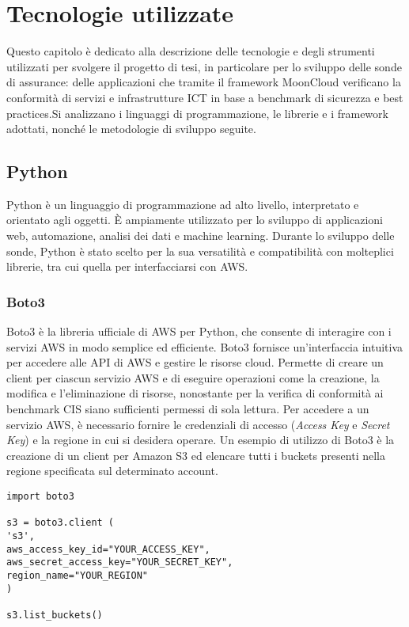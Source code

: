 \chapter{Tecnologie utilizzate}
\label{cap:tecnologie}

Questo capitolo è dedicato alla descrizione delle tecnologie e degli strumenti utilizzati per svolgere il progetto di tesi, in particolare per lo sviluppo delle sonde di assurance: delle applicazioni che tramite il framework MoonCloud verificano la conformità di servizi e infrastrutture ICT in base a benchmark di sicurezza e best practices.Si analizzano i linguaggi di programmazione, le librerie e i framework adottati, nonché le metodologie di sviluppo seguite. 


\section{Python}
\label{sec:python}

Python è un linguaggio di programmazione ad alto livello, interpretato e orientato agli oggetti. È ampiamente utilizzato per lo sviluppo di applicazioni web, automazione, analisi dei dati e machine learning. Durante lo sviluppo delle sonde, Python è stato scelto per la sua versatilità e compatibilità con molteplici librerie, tra cui quella per interfacciarsi con AWS.

\subsection{Boto3}
\label{sec:boto3}

Boto3 è la libreria ufficiale di AWS per Python, che consente di interagire con i servizi AWS in modo semplice ed efficiente. Boto3 fornisce un'interfaccia intuitiva per accedere alle API di AWS e gestire le risorse cloud. Permette di creare un client per ciascun servizio AWS e di eseguire operazioni come la creazione, la modifica e l'eliminazione di risorse, nonostante per la verifica di conformità ai benchmark CIS siano sufficienti permessi di sola lettura. Per accedere a un servizio AWS, è necessario fornire le credenziali di accesso (\textit{Access Key} e \textit{Secret Key}) e la regione in cui si desidera operare. Un esempio di utilizzo di Boto3 è la creazione di un client per Amazon S3 ed elencare tutti i buckets presenti nella regione specificata sul determinato account.

\begin{lstlisting}[style=mypython, caption={Esempio di utilizzo di Boto3 per elencare i bucket S3}]
import boto3

s3 = boto3.client (
's3',
aws_access_key_id="YOUR_ACCESS_KEY",
aws_secret_access_key="YOUR_SECRET_KEY",
region_name="YOUR_REGION"
)

s3.list_buckets()
\end{lstlisting}

